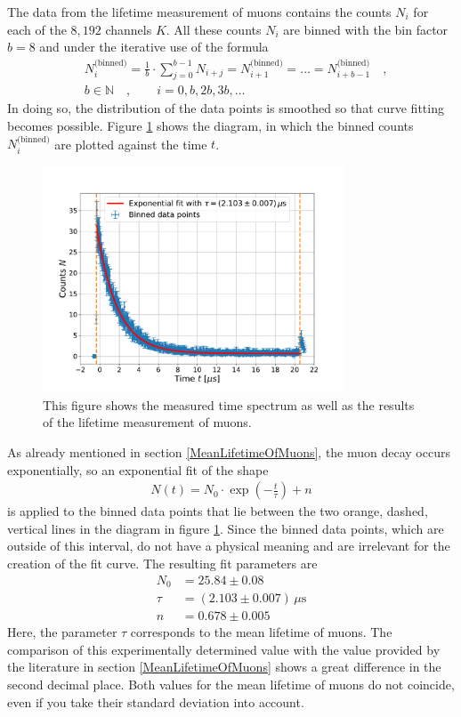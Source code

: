 The data from the lifetime measurement of muons contains the counts $N_i$ for each of the $8,192$ channels $K$.
All these counts $N_i$ are binned with the bin factor $b=8$ and under the iterative use of the formula
\begin{align} \label{Binning}
&N_i^\text{(binned)}=\frac{1}{b}\cdot\sum_{j=0}^{b-1}N_{i+j}=N_{i+1}^\text{(binned)}=\ldots =N_{i+b-1}^\text{(binned)}\quad ,\\
&b\in\mathbb{N}\quad ,\quad\quad i=0,b,2b,3b,\dotsc\nonumber
\end{align}
\noindent In doing so, the distribution of the data points is smoothed so that curve fitting becomes possible.
Figure \ref{MeanLifetime} shows the diagram, in which the binned counts $N_i^\text{(binned)}$ are plotted against the time $t$.
\begin{figure}[H]
	\centering
	\includegraphics[width=0.8\textwidth]{src/MeanLifetime}
	\caption{This figure shows the measured time spectrum as well as the results of the lifetime measurement of muons.}
	\label{MeanLifetime}
\end{figure}
\noindent As already mentioned in section \ref{MeanLifetimeOfMuons}, the muon decay occurs exponentially, so an exponential fit of the shape
\begin{align} \label{exponential}
N(t)=N_0\cdot\exp\left(-\frac{t}{\tau}\right) + n
\end{align}
\noindent is applied to the binned data points that lie between the two orange, dashed, vertical lines in the diagram in figure \ref{MeanLifetime}.
Since the binned data points, which are outside of this interval, do not have a physical meaning and are irrelevant for the creation of the fit curve.
The resulting fit parameters are
\begin{align*}
N_0 &= 25.84\pm 0.08 \\
\tau &= (2.103\pm 0.007)\,\mu\text{s} \\
n &= 0.678\pm 0.005
\end{align*}
\noindent Here, the parameter $\tau$ corresponds to the mean lifetime of muons.
The comparison of this experimentally determined value with the value provided by the literature in section \ref{MeanLifetimeOfMuons} shows a great difference in the second decimal place.
Both values for the mean lifetime of muons do not coincide, even if you take their standard deviation into account.



